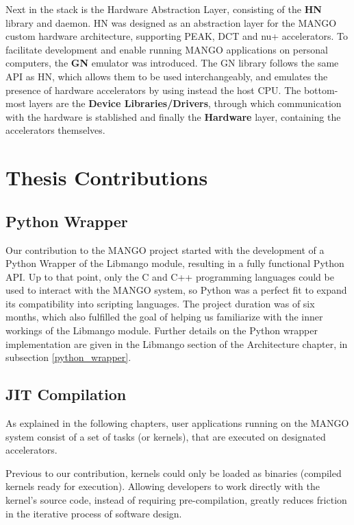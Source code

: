 Next in the stack is the Hardware Abstraction Layer, consisting of the \textbf{HN} library and daemon. HN was designed as an abstraction layer for the MANGO custom hardware architecture, supporting PEAK, DCT and nu+ accelerators. To facilitate development and enable running MANGO applications on personal computers, the \textbf{GN} emulator was introduced. The GN library follows the same API as HN, which allows them to be used interchangeably, and emulates the presence of hardware accelerators by using instead the host CPU.
The bottom-most layers are the \textbf{Device Libraries/Drivers}, through which communication with the hardware is stablished and finally the \textbf{Hardware} layer, containing the accelerators themselves.

\section{Thesis Contributions}
\subsection{Python Wrapper}

Our contribution to the MANGO project started with the development of a Python Wrapper of the Libmango module, resulting in a fully functional Python API. Up to that point, only the C and C++ programming languages could be used to interact with the MANGO system, so Python was a perfect fit to expand its compatibility into scripting languages. The project duration was of six months, which also fulfilled the goal of helping us familiarize with the inner workings of the Libmango module. Further details on the Python wrapper implementation are given in the Libmango section of the Architecture chapter, in subsection \ref{python_wrapper}.

\subsection{JIT Compilation}

As explained in the following chapters, user applications running on the MANGO system consist of a set of tasks (or kernels), that are executed on designated accelerators. 

Previous to our contribution, kernels could only be loaded as binaries (compiled kernels ready for execution). 
Allowing developers to work directly with the kernel's source code, instead of requiring pre-compilation, greatly reduces friction in the iterative process of software design.

